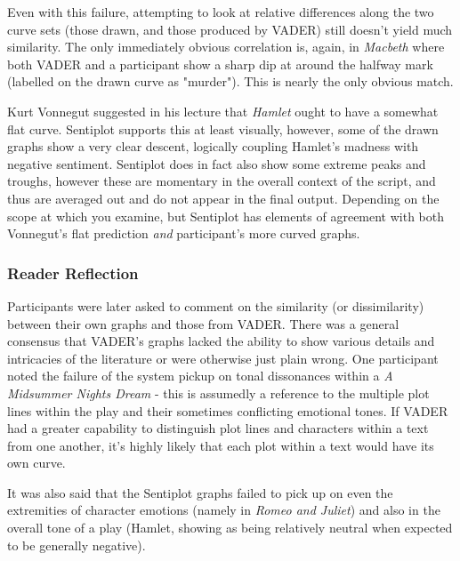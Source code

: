 \documentclass{article}
\begin{document}
{            Even with this failure, attempting to look at relative differences along the two curve sets (those drawn, and those produced by VADER) still doesn't yield much similarity. The only immediately obvious correlation is, again, in \textit{Macbeth} where both VADER and a participant show a sharp dip at around the halfway mark (labelled on the drawn curve as "murder"). This is nearly the only obvious match.
            
            Kurt Vonnegut suggested in his lecture that \textit{Hamlet} ought to have a somewhat flat curve. Sentiplot supports this at least visually, however, some of the drawn graphs show a very clear descent, logically coupling Hamlet's madness with negative sentiment. Sentiplot does in fact also show some extreme peaks and troughs, however these are momentary in the overall context of the script, and thus are averaged out and do not appear in the final output. Depending on the scope at which you examine, but Sentiplot has elements of agreement with both Vonnegut's flat prediction \textit{and} participant's more curved graphs.
			\subsubsection{Reader Reflection}
                Participants were later asked to comment on the similarity (or dissimilarity) between their own graphs and those from VADER. There was a general consensus that VADER's graphs lacked the ability to show various details and intricacies of the literature or were otherwise just plain wrong. 
                One participant noted the failure of the system pickup on tonal dissonances within a \textit{A Midsummer Nights Dream} - this is assumedly a reference to the multiple plot lines within the play and their sometimes conflicting emotional tones. If VADER had a greater capability to distinguish plot lines and characters within a text from one another, it's highly likely that each plot within a text would have its own curve.
                
                It was also said that the Sentiplot graphs failed to pick up on even the extremities of character emotions (namely in \textit{Romeo and Juliet}) and also in the overall tone of a play (Hamlet, showing as being relatively neutral when expected to be generally negative).

}
\end{document}
